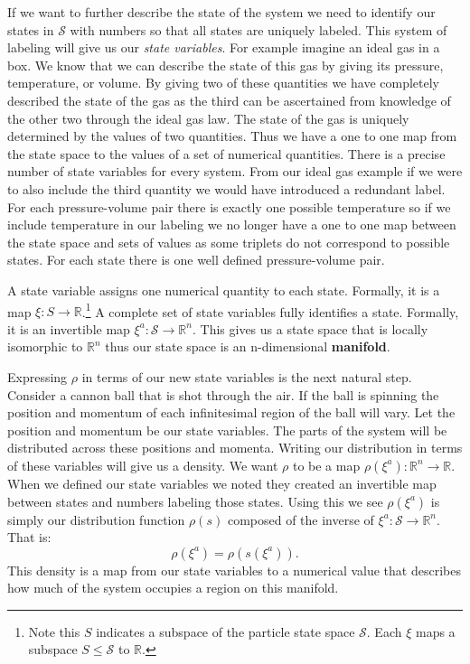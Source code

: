 \documentclass{article}[a4paper]
\begin{document}
	
	If we want to further describe the state of the system we need to identify our states in $\mathcal{S}$ with numbers so that all states are uniquely labeled. This system of labeling will give us our \textit{state variables}. For example imagine an ideal gas in a box. We know that we can describe the state of this gas by giving its pressure, temperature, or volume. By giving two of these quantities we have completely described the state of the gas as the third can be ascertained from knowledge of the other two through the ideal gas law. The state of the gas is uniquely determined by the values of two quantities. Thus we have a one to one map from the state space to the values of a set of numerical quantities. There is a precise number of state variables for every system. From our ideal gas example if we were to also include the third quantity we would have introduced a redundant label. For each pressure-volume pair there is exactly one possible temperature so if we include temperature in our labeling we no longer have a one to one map between the state space and sets of values as some triplets do not correspond to possible states. For each state there is one well defined pressure-volume pair. 

\begin{defn}
	A state variable assigns one numerical quantity to each state. Formally, it is a map $\xi : S \to \mathbb{R}$.\footnote{Note this $S$ indicates a subspace of the particle state space $\mathcal{S}$. Each $\xi$ maps a subspace  $S \le \mathcal{S}$ to $\mathbb{R}$.} A complete set of state variables fully identifies a state. Formally, it is an invertible  map $\xi^a : \mathcal{S} \rightarrow \mathbb{R}^n $. This gives us a state space that is locally isomorphic to $\mathbb{R}^n$ thus our state space is an n-dimensional \textbf{manifold}.
\end{defn}

		
	Expressing $\rho$ in terms of our new state variables is the next natural step. Consider a cannon ball that is shot through the air. If the ball is spinning the position and momentum of each infinitesimal region of the ball will vary. Let the position and momentum be our state variables. The parts of the system will be distributed across these positions and momenta. Writing our distribution in terms of these variables will give us a density. We want $\rho$ to be a map $\rho(\xi^a): \mathbb{R}^n \to \mathbb{R}$. When we defined our state variables we noted they created an invertible map between states and numbers labeling those states. Using this we see $\rho(\xi^a)$ is simply our distribution function $\rho(s)$ composed of the inverse of $\xi^a: \mathcal{S}\to \mathbb{R}^n$. That is: $$\rho(\xi^a) = \rho(s(\xi^a)).$$ This density is a map from our state variables to a numerical value that describes how much of the system occupies a region on this manifold.
	
\end{document}
